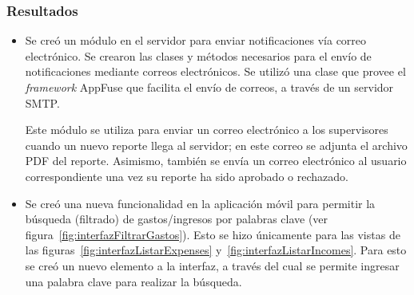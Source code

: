 \subsubsection{Resultados}
\begin{itemize}
\item Se creó un módulo en el servidor para enviar notificaciones vía correo electrónico. Se crearon las clases y métodos necesarios para el envío de notificaciones mediante correos electrónicos. Se utilizó una clase que provee el \textit{framework} AppFuse que facilita el envío de correos, a través de un servidor SMTP. 

Este módulo se utiliza para enviar un correo electrónico a los supervisores cuando un nuevo reporte llega al servidor; en este correo se adjunta el archivo PDF del reporte. Asimismo, también se envía un correo electrónico al usuario correspondiente una vez su reporte ha sido aprobado o rechazado.
\item Se creó una nueva funcionalidad en la aplicación móvil para permitir la búsqueda (filtrado) de gastos/ingresos por palabras clave (ver figura~\ref{fig:interfazFiltrarGastos}). Esto se hizo únicamente para las vistas de las figuras~\ref{fig:interfazListarExpenses} y~\ref{fig:interfazListarIncomes}. Para esto se creó un nuevo elemento a la interfaz, a través del cual se permite ingresar una palabra clave para realizar la búsqueda.
\end{itemize}
%
%
%
%
%
